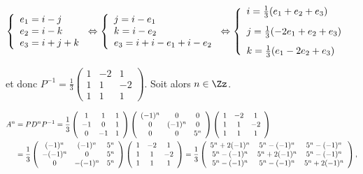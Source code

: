 {{\begin{center}
$\left\{
\begin{array}{l}
e_1=i-j\\
e_2=i-k\\
e_3=i+j+k
\end{array}
\right.\Leftrightarrow\left\{
\begin{array}{l}
j=i-e_1\\
k=i-e_2\\
e_3=i+i-e_1+i-e_2
\end{array}
\right.\Leftrightarrow\left\{
\begin{array}{l}
i=\frac{1}{3}(e_1+e_2+e_3)\\
\rule[-4mm]{0mm}{10mm}j=\frac{1}{3}(-2e_1+e_2+e_3)\\
k=\frac{1}{3}(e_1-2e_2+e_3)
\end{array}
\right.$
\end{center}

et donc $P^{-1}=\frac{1}{3}\left(
\begin{array}{ccc}
1&-2&1\\
1&1&-2\\
1&1&1
\end{array}
\right)$. Soit alors $n\in\Zz$.

\begin{align*}\ensuremath 
A^n&= PD^nP^{-1}=\frac{1}{3}\left(
\begin{array}{ccc}
1&1&1\\
-1&0&1\\
0&-1&1
\end{array}
\right)\left(
\begin{array}{ccc}
(-1)^n&0&0\\
0&(-1)^n&0\\
0&0&5^n
\end{array}
\right)\left(
\begin{array}{ccc}
1&-2&1\\
1&1&-2\\
1&1&1
\end{array}
\right)\\
 &=\frac{1}{3}\left(
\begin{array}{ccc}
(-1)^n&(-1)^n&5^n\\
-(-1)^n&0&5^n\\
0&-(-1)^n&5^n
\end{array}
\right)\left(
\begin{array}{ccc}
1&-2&1\\
1&1&-2\\
1&1&1
\end{array}
\right)=\frac{1}{3}\left(\begin{array}{ccc}
5^n+2(-1)^n&5^n-(-1)^n&5^n-(-1)^n\\
5^n-(-1)^n&5^n+2(-1)^n&5^n-(-1)^n\\
5^n-(-1)^n&5^n-(-1)^n&5^n+2(-1)^n
\end{array}
\right),
\end{align*}

}}
